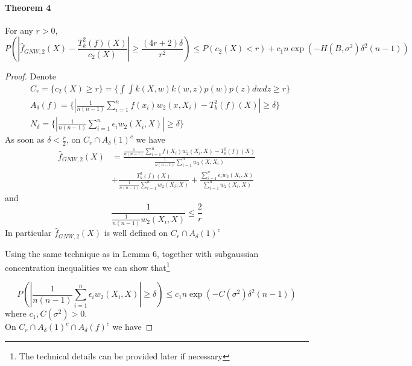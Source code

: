\documentclass{article}
\begin{document}
\paragraph{Theorem 4} For any $r>0$, 
\begin{equation*}
  P(|\hat{f}_{GNW,2}(X)-\frac{T_k^2(f)(X)}{c_2(X)}|
   \geq \frac{(4r+2)\delta}{r^2})\leq P(c_2(X)<r)+c_1n\exp(-H(B,\sigma^2)\delta^2(n-1))
\end{equation*}
\begin{proof}
Denote 
\begin{equation*}
\begin{split}
    &C_r=\{c_2(X)\geq r\}=\{\int\int k(X,w)k(w,z)p(w)p(z)dwdz\geq r\}\\
    &A_{\delta}(f)=\{|\frac{1}{n(n-1)}\sum_{i=1}^n f(x_i)w_2(x,X_i)-T_k^2(f)(X)|\geq \delta\}\\
    &N_{\delta}=\{|\frac{1}{n(n-1)}\sum_{i=1}^n \epsilon_i w_2(X_i,X)|\geq \delta\}
\end{split}
\end{equation*}
As soon as $\delta<\frac{r}{2}$, on $C_r\cap A_{\delta}(1)^c$ we have
\begin{equation*}
    \begin{split}
        \hat{f}_{GNW,2}(X)
        &=\frac{\frac{1}{n(n-1)}\sum_{i=1}^n f(X_i)w_2(X_i,X)-T_k^2(f)(X)}{\frac{1}{n(n-1)}
        \sum_{i=1}^n w_2(X,X_i)}\\
        &+\frac{
        T_k^2(f)(X)}{\frac{1}{n(n-1)}\sum_{i=1}^n w_2(X_i,X)}+\frac{\sum_{i=1}^n \epsilon_iw_2(X_i,X)}{\sum_{i=1}^n w_2(X_i,X)}
    \end{split}
\end{equation*}
and 
\begin{equation*}
    \frac{1}{\frac{1}{n(n-1)}w_2(X_i,X)}\leq \frac{2}{r}
\end{equation*}
In particular $\hat{f}_{GNW,2}(X)$ is well defined on $C_r\cap A_{\delta}(1)^c$ 

Using the same technique as in Lemma 6, together with subgaussian concentration inequalities we can show that\footnote{ The technical details can be provided later if necessary}

\begin{equation*}
    P(|\frac{1}{n(n-1)}\sum_{i=1}^n \epsilon_i w_2(X_i,X)|\geq \delta)\leq c_1n\exp(-C(\sigma^2)\delta^2(n-1)) 
\end{equation*}
where $c_1,C(\sigma^2)>0$.
\\
On $C_r\cap A_{\delta}(1)^c\cap A_{\delta}(f)^c$ we have


\end{proof}
\end{document}
